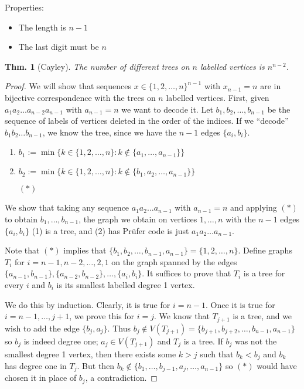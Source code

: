 \documentclass[12pt, a4paper]{book}
\newtheorem{theorem}{Thm.}[section]
\theoremstyle{nonumberplain}
\newtheorem{proof}{Proof}
\begin{document}
Properties:
\begin{itemize}[nolistsep]
    \item The length is $n-1$
    \item The last digit must be $n$
\end{itemize}
\begin{theorem}[Cayley]
    The number of different trees on $n$ labelled vertices is $n^{n-2}$.
\end{theorem}
\begin{proof}
    We will show that sequences $x\in\{1,2,\ldots,n\}^{n-1}$ with $x_{n-1}=n$ are in bijective correspondence with the trees on $n$ labelled vertices.
    First, given $a_1a_2\ldots a_{n-2}a_{n-1}$ with $a_{n-1}=n$ we want to decode it.
    Let $b_1,b_2,\ldots,b_{n-1}$ be the sequence of labels of vertices deleted in the order of the indices.
    If we ``decode'' $b_1b_2\ldots b_{n-1}$, we know the tree, since we have the $n-1$ edges $\{a_i,b_i\}$.
    \begin{enumerate}
        \item $b_1:=\min\{k\in\{1,2,\ldots,n\}:k\notin \{a_1,\ldots,a_{n-1}\}\}$
        \item $b_2:=\min\{k\in\{1,2,\ldots,n\}:k\notin \{b_1,a_2,\ldots,a_{n-1}\}\}$
        \item[$(*)$] 
    \end{enumerate}
    We show that taking any sequence $a_1a_2\ldots a_{n-1}$ with $a_{n-1}=n$ and applying $(*)$ to obtain $b_1,\ldots,b_{n-1}$, the graph we obtain on vertices $1,\ldots,n$ with the $n-1$ edges $\{a_i,b_i\}$ (1) is a tree, and (2) has Pr\"ufer code is just $a_1a_2\ldots a_{n-1}$.

    Note that $(*)$ implies that $\{b_1,b_2,\ldots,b_{n-1},a_{n-1}\}=\{1,2,\ldots,n\}$.
    Define graphs $T_i$ for $i=n-1,n-2,\ldots,2,1$ on the graph spanned by the edges $\{a_{n-1},b_{n-1}\},\{a_{n-2},b_{n-2}\},\ldots,\{a_i,b_i\}$.
    It suffices to prove that $T_i$ is a tree for every $i$ and $b_i$ is its smallest labelled degree 1 vertex.

    We do this by induction.
    Clearly, it is true for $i=n-1$.
    Once it is true for $i=n-1,\ldots,j+1$, we prove this for $i=j$.
    We know that $T_{j+1}$ is a tree, and we wish to add the edge $\{b_j,a_j\}$.
    Thus $b_j\notin V(T_{j+1})=\{b_{j+1},b_{j+2},\ldots,b_{n-1},a_{n-1}\}$ so $b_j$ is indeed degree one; $a_j\in V(T_{j+1})$ and $T_j$ is a tree.
    If $b_j$ was not the smallest degree 1 vertex, then there exists some $k>j$ such that $b_k<b_j$ and $b_k$ has degree one in $T_j$.
    But then $b_k\notin\{b_1,\ldots,b_{j-1},a_j,\ldots,a_{n-1}\}$ so $(*)$ would have chosen it in place of $b_j$, a contradiction.
\end{proof}
\end{document}
